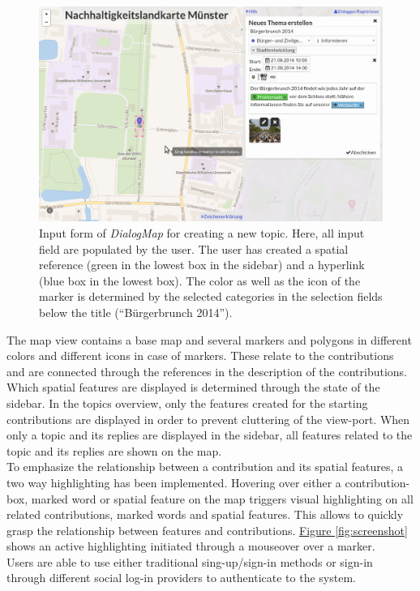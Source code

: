 \begin{figure}[!h]
    \centering
    \includegraphics[width=1\columnwidth]{images/screenshot_create}
    \caption{Input form of \textit{DialogMap} for creating a new topic. Here, all input field are populated by the user. The user has created a spatial reference (green in the lowest box in the sidebar) and a hyperlink (blue box in the lowest box). The color as well as the icon of the marker is determined by the selected categories in the selection fields below the title (``Bürgerbrunch 2014'').}
    \label{fig:screenshot_create}
\end{figure}

The map view contains a base map and several markers and polygons in different colors and different icons in case of markers. These relate to the contributions and are connected through the references in the description of the contributions. Which spatial features are displayed is determined through the state of the sidebar. In the topics overview, only the features created for the starting contributions are displayed in order to prevent cluttering of the view-port. When only a topic and its replies are displayed in the sidebar, all features related to the topic and its replies are shown on the map.\\
To emphasize the relationship between a contribution and its spatial features, a two way highlighting has been implemented. Hovering over either a contribution-box, marked word or spatial feature on the map triggers visual highlighting on all related contributions, marked words and spatial features. This allows to quickly grasp the relationship between features and contributions. \hyperref[fig:screenshot]{Figure \ref{fig:screenshot}} shows an active highlighting initiated through a mouseover over a marker.\\
Users are able to use either traditional sing-up/sign-in methods or sign-in through different social log-in providers to authenticate to the system.

